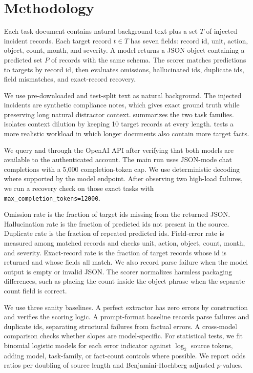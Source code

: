 \section{Methodology}
\label{sec:method}

Each task document contains natural background text plus a set $T$ of injected incident records. Each target record $t \in T$ has seven fields: record id, unit, action, object, count, month, and severity. A model returns a JSON object containing a predicted set $P$ of records with the same schema. The scorer matches predictions to targets by record id, then evaluates omissions, hallucinated ids, duplicate ids, field mismatches, and exact-record recovery.

We use pre-downloaded \qmsum and \govreport test-split text as natural background. The injected incidents are synthetic compliance notes, which gives exact ground truth while preserving long natural distractor context.  summarizes the two task families. \fixedload isolates context dilution by keeping 10 target records at every length. \scaledload tests a more realistic workload in which longer documents also contain more target facts.



We query \gptfourmini and \gptfivemini through the OpenAI API after verifying that both models are available to the authenticated account. The main run uses JSON-mode chat completions with a 5,000 completion-token cap. We use deterministic decoding where supported by the model endpoint. After observing two high-load \gptfivemini failures, we run a recovery check on those exact tasks with \texttt{max\_completion\_tokens=12000}.

Omission rate is the fraction of target ids missing from the returned JSON. Hallucination rate is the fraction of predicted ids not present in the source. Duplicate rate is the fraction of repeated predicted ids. Field-error rate is measured among matched records and checks unit, action, object, count, month, and severity. Exact-record rate is the fraction of target records whose id is returned and whose fields all match. We also record parse failure when the model output is empty or invalid JSON. The scorer normalizes harmless packaging differences, such as placing the count inside the object phrase when the separate count field is correct.

We use three sanity baselines. A perfect extractor has zero errors by construction and verifies the scoring logic. A prompt-format baseline records parse failures and duplicate ids, separating structural failures from factual errors. A cross-model comparison checks whether slopes are model-specific. For statistical tests, we fit binomial logistic models for each error indicator against $\log_2$ source tokens, adding model, task-family, or fact-count controls where possible. We report odds ratios per doubling of source length and Benjamini-Hochberg adjusted $p$-values.
